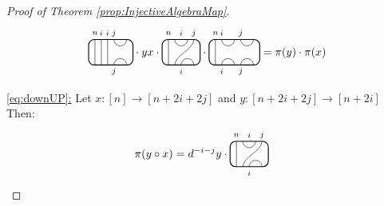 \documentclass[11pt]{article}
\theoremstyle{plain}
\theoremstyle{definition}
\newcommand{\TLPlusPIso}[3]{
	\TLTStart
	\TLTThrough{#1}
	\TLTSnakeR{#2}{#3}
	\TLTEnd
}
\newcommand{\TLMinusPIso}[3]{
	\TLTStart
	\TLTThrough{#1}
	\TLTSnakeL{#2}{#3}
	\TLTEnd
}
\newcommand{\TLTCalcLabelOffset}[3][0cm]{
	\settowidth{#2}{\scriptsize{$#3$}}
	\setlength{#2}{.5#2}
	\setlength{#2}{\maxof{#2}{#1}}
}
\newcommand{\TLTEnd}{
	\draw[thick, rounded corners = 5pt] (0,0) rectangle ($ (TLTlead) + (0,.8) $);
 \end{tikzpicture}
}
\newcommand{\TLTStart}{
 \begin{tikzpicture}[baseline=.3cm]
	\coordinate (TLTlead) at (.2,0); %
	\let\TLTlabelwidth\relax
	\newlength{\TLTlabelwidth}
}
\newcommand{\TLTThrough}[1]{
	\TLTCalcLabelOffset[.2cm]{\TLTlabelwidth}{#1}
	\coordinate (TLTlead) at ($ (TLTlead) + ({\TLTlabelwidth},0) $);
	\begin{scope}[shift=(TLTlead)]
		\draw (0,0) -- (0,.8);
		\node at (0,1) {\scriptsize{$#1$}};
	\end{scope}
		\coordinate (TLTlead) at ($ (TLTlead) + ({\TLTlabelwidth},0) $);
}
\newcommand{\TLTCapcup}[1]{
	\TLTCalcLabelOffset[.2cm]{\TLTlabelwidth}{#1}
		\coordinate (TLTlead) at ($ (TLTlead) + ({\TLTlabelwidth},0) $);
	\begin{scope}[shift=(TLTlead)]
		\draw (0,0) arc (180:0:.2);
		\draw (0,.8) arc (-180:0:.2);
		\node at (0,1) {\scriptsize{$#1$}};
	\end{scope}
	\TLTCalcLabelOffset[.5cm]{\TLTlabelwidth}{#1}
	\coordinate (TLTlead) at ($ (TLTlead) + ({\TLTlabelwidth},0)$);
}
\newcommand{\TLTSnakeR}[2]{
	\let\TLTscwidth\relax
	\newlength{\TLTscwidth}
	\let\TLTsswidth\relax
	\newlength{\TLTsswidth}
	\TLTCalcLabelOffset[.2cm]{\TLTscwidth}{#1}
	\TLTCalcLabelOffset[.5cm]{\TLTsswidth}{#2}
	\setlength{\TLTlabelwidth}{\TLTscwidth+\TLTsswidth}
	\setlength{\TLTlabelwidth}{\maxof{\TLTlabelwidth}{.7cm}} %
	\coordinate (TLTlead) at ($ (TLTlead) + ({\TLTscwidth},0) $);
	\begin{scope}[shift=(TLTlead)]
		\draw (.1,.8) arc (-180:0:.2cm);
		\draw (.1,0) .. controls ++(90:.3cm) and ++(270:.3cm) .. ($ (.1,.8) + ({\TLTlabelwidth},0) $);
		\draw ($ (.1,0) + ({\TLTsswidth},0) $) arc (180:0:.2cm);
		\node at (.1,1) {\scriptsize{$#1$}};
		\node at ($ (.1,1) + ({\TLTlabelwidth},0) $) {\scriptsize{$#2$}};
		\node at ($ (.1,-.2) + ({\TLTsswidth},0) $) {\scriptsize{$#1$}};
	\end{scope}
	\coordinate (TLTlead) at ($ (TLTlead) + ({\TLTlabelwidth+\TLTsswidth},0) $);
}
\newcommand{\TLTSnakeL}[2]{
	\let\TLTscwidth\relax
	\newlength{\TLTscwidth}
	\let\TLTsswidth\relax
	\newlength{\TLTsswidth}
	\TLTCalcLabelOffset[.2cm]{\TLTscwidth}{#1}
	\TLTCalcLabelOffset[.1cm]{\TLTsswidth}{#2}
	\setlength{\TLTlabelwidth}{\TLTscwidth+\TLTsswidth}
	\setlength{\TLTlabelwidth}{\maxof{\TLTlabelwidth}{.5cm}} %
	\coordinate (TLTlead) at ($ (TLTlead) + ({\TLTsswidth},0) $);
	\begin{scope}[shift=(TLTlead)]
		\draw ($ (.1,.8) + ({\TLTsswidth+\TLTscwidth},0) $) arc (-180:0:.2cm);
		\draw ($ (.1,0) + ({\TLTlabelwidth},0) $) .. controls ++(90:.3cm) and ++(270:.3cm) .. (.1,.8);
		\draw (.1,0) arc (180:0:.2cm);
		\node at ($ (.1,1) + ({\TLTsswidth+\TLTscwidth},0) $) {\scriptsize{$#1$}};
		\node at (.1,1) {\scriptsize{$#2$}};
		\node at (.1,-.2) {\scriptsize{$#1$}};
	\end{scope}
	\setlength{\TLTscwidth}{\maxof{\TLTscwidth}{.5cm}} %
	\coordinate (TLTlead) at ($ (TLTlead) + ({\TLTlabelwidth+\TLTscwidth},0) $);
}
\begin{document}
\begin{proof}[Proof of Theorem \ref{prop:InjectiveAlgebraMap}]
\begin{align*}
\begin{tikzpicture}[baseline=.3cm]
		\draw (.2,0) -- (.2,.8);
		\node at (.2,1) {\scriptsize{$n$}};
		\draw (.4,0) -- (.4,.8);
		\node at (.4,1) {\scriptsize{$i$}};
		\draw (.6,0) -- (.6,.8);
		\node at (.6,1) {\scriptsize{$i$}};
		\draw (.8,0) arc (180:0:.2cm);
		\node at (.8,-.2) {\scriptsize{$j$}};
		\draw (.8,.8) arc (-180:0:.2cm);
		\node at (.8,1) {\scriptsize{$j$}};
		\draw[thick, rounded corners = 5pt] (0,0) rectangle (1.4,.8);
	\end{tikzpicture}
	\cdot yx \cdot 
	\begin{tikzpicture}[baseline=.3cm]
		\draw (.2,0) -- (.2,.8);
		\node at (.2,1) {\scriptsize{$n$}};
		\draw (.6,0) arc (180:0:.2cm);
		\node at (.6,-.2) {\scriptsize{$i$}};
		\draw (.4,0) .. controls ++(90:.3cm) and ++(270:.3cm) .. (1,.8);
		\node at (1,1) {\scriptsize{$j$}};
		\draw (.4,.8) arc (-180:0:.2cm);
		\node at (.6,1) {\scriptsize{$i$}};
		\draw[thick, rounded corners = 5pt] (0,0) rectangle (1.2,.8);
	\end{tikzpicture}
	\cdot
	\begin{tikzpicture}[baseline=.3cm]
		\draw (.2,0) -- (.2,.8);
		\node at (.2,1) {\scriptsize{$n$}};
		\draw (.4,0) arc (180:0:.2cm);
		\node at (.4,-.2) {\scriptsize{$i$}};
		\draw (.4,.8) arc (-180:0:.2cm);
		\node at (.4,1) {\scriptsize{$i$}};
		\draw (1,0) arc (180:0:.2cm);
		\node at (1,-.2) {\scriptsize{$j$}};
		\draw (1,.8) arc (-180:0:.2cm);
		\node at (1,1) {\scriptsize{$j$}};
		\draw[thick, rounded corners = 5pt] (0,0) rectangle (1.6,.8);
	\end{tikzpicture} %
	= \pi(y) \cdot \pi(x)
\end{align*}
\item[\underline{\ref{eq:downUP}:}]
Let $x:[n]\rightarrow [n+2i+2j]$ and $y:[n+2i+2j]\rightarrow [n+2i]$
Then:
\begin{align*}
	\pi(y\circ x) &= d^{-i-j}y\cdot
	\begin{tikzpicture}[baseline=.3cm]
		\draw (.2,0) -- (.2,.8);
		\node at (.2,1) {\scriptsize{$n$}};
		\draw (.6,0) arc (180:0:.2cm);
		\node at (.6,-.2) {\scriptsize{$i$}};
		\draw (.4,0) .. controls ++(90:.3cm) and ++(270:.3cm) .. (1,.8);
		\node at (1,1) {\scriptsize{$j$}};
		\draw (.4,.8) arc (-180:0:.2cm);
		\node at (.6,1) {\scriptsize{$i$}};
		\draw[thick, rounded corners = 5pt] (0,0) rectangle (1.2,.8);
	\end{tikzpicture}

\end{align*}
\end{proof}
\end{document}
